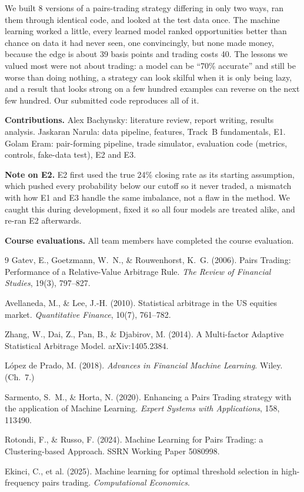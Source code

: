 \documentclass[10pt]{article}
\begin{document}
We built 8 versions of a pairs-trading strategy differing in only two ways, ran
them through identical code, and looked at the test data once. The machine
learning worked a little, every learned model ranked opportunities better than
chance on data it had never seen, one convincingly, but none made money,
because the edge is about 39 basis points and trading costs 40. The lessons we
valued most were not about trading: a model can be ``70\% accurate'' and still be
worse than doing nothing, a strategy can look skilful when it is only being lazy,
and a result that looks strong on a few hundred examples can reverse on the next
few hundred. Our submitted code reproduces all of it.

\bigskip
\noindent\textbf{Contributions.} Alex Bachynsky: literature review, report writing,
results analysis. Jaskaran Narula: data pipeline, features, Track~B fundamentals, E1.
Golam Eram: pair-forming pipeline, trade simulator, evaluation code (metrics,
controls, fake-data test), E2 and E3.

\smallskip
\noindent\textbf{Note on E2.} E2 first used the true 24\% closing rate as its
starting assumption, which pushed every probability below our cutoff so it never
traded, a mismatch with how E1 and E3 handle the same imbalance, not a flaw in
the method. We caught this during development, fixed it so all four models are
treated alike, and re-ran E2 afterwards.

\smallskip
\noindent\textbf{Course evaluations.} All team members have completed the course
evaluation. %

\begin{thebibliography}{9}
\small
{}
Gatev, E., Goetzmann, W.~N., \& Rouwenhorst, K.~G. (2006).
Pairs Trading: Performance of a Relative-Value Arbitrage Rule.
\emph{The Review of Financial Studies}, 19(3), 797--827.

Avellaneda, M., \& Lee, J.-H. (2010).
Statistical arbitrage in the US equities market.
\emph{Quantitative Finance}, 10(7), 761--782.

Zhang, W., Dai, Z., Pan, B., \& Djabirov, M. (2014).
A Multi-factor Adaptive Statistical Arbitrage Model. arXiv:1405.2384.

López de Prado, M. (2018).
\emph{Advances in Financial Machine Learning}. Wiley. (Ch.~7.)

Sarmento, S.~M., \& Horta, N. (2020).
Enhancing a Pairs Trading strategy with the application of Machine Learning.
\emph{Expert Systems with Applications}, 158, 113490.

Rotondi, F., \& Russo, F. (2024).
Machine Learning for Pairs Trading: a Clustering-based Approach.
SSRN Working Paper 5080998.

Ekinci, C., et al. (2025).
Machine learning for optimal threshold selection in high-frequency pairs trading.
\emph{Computational Economics}.
\end{thebibliography}
\end{document}

